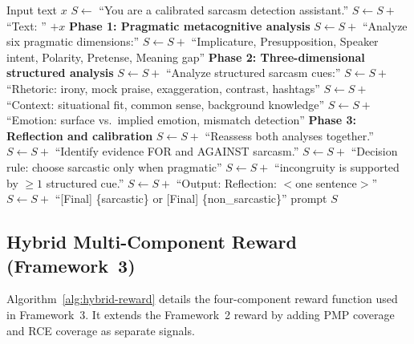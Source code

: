 \documentclass{article} %
\begin{document}
\begin{algorithm}[htbp]
\caption{Hybrid Three-Phase Prompt Construction (Framework~3)}
\label{alg:hybrid-prompt}
\begin{algorithmic}[1]
\REQUIRE Input text $x$
\STATE $S \leftarrow$ ``You are a calibrated sarcasm detection assistant.''
\STATE $S \leftarrow S +$ ``Text: '' $+ x$
\STATE
\STATE \textbf{Phase 1: Pragmatic metacognitive analysis}
\STATE $S \leftarrow S +$ ``Analyze six pragmatic dimensions:''
\STATE \quad $S \leftarrow S +$ ``Implicature, Presupposition, Speaker intent, Polarity, Pretense, Meaning gap''
\STATE
\STATE \textbf{Phase 2: Three-dimensional structured analysis}
\STATE $S \leftarrow S +$ ``Analyze structured sarcasm cues:''
\STATE \quad $S \leftarrow S +$ ``Rhetoric: irony, mock praise, exaggeration, contrast, hashtags''
\STATE \quad $S \leftarrow S +$ ``Context: situational fit, common sense, background knowledge''
\STATE \quad $S \leftarrow S +$ ``Emotion: surface vs.\ implied emotion, mismatch detection''
\STATE
\STATE \textbf{Phase 3: Reflection and calibration}
\STATE $S \leftarrow S +$ ``Reassess both analyses together.''
\STATE $S \leftarrow S +$ ``Identify evidence FOR and AGAINST sarcasm.''
\STATE $S \leftarrow S +$ ``Decision rule: choose sarcastic only when pragmatic''
\STATE $S \leftarrow S +$ ``incongruity is supported by $\geq 1$ structured cue.''
\STATE
\STATE $S \leftarrow S +$ ``Output: Reflection: $<$one sentence$>$''
\STATE $S \leftarrow S +$ ``[Final] \{sarcastic\} or [Final] \{non\_sarcastic\}''
\RETURN prompt $S$
\end{algorithmic}
\end{algorithm}

\subsection{Hybrid Multi-Component Reward (Framework~3)}

Algorithm~\ref{alg:hybrid-reward} details the four-component reward function used in Framework~3. It extends the Framework~2 reward by adding PMP coverage and RCE coverage as separate signals.
\end{document}
